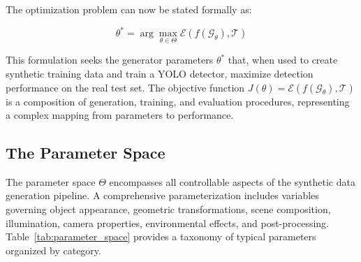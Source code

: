 The optimization problem can now be stated formally as:

\begin{equation}
\theta^* = \arg\max_{\theta \in \Theta} \mathcal{E}(f(\mathcal{G}_\theta), \mathcal{T})
\label{eq:optimization_objective}
\end{equation}

This formulation seeks the generator parameters $\theta^*$ that, when used to create synthetic training data and train a YOLO detector, maximize detection performance on the real test set. The objective function $J(\theta) = \mathcal{E}(f(\mathcal{G}_\theta), \mathcal{T})$ is a composition of generation, training, and evaluation procedures, representing a complex mapping from parameters to performance.

\subsection{The Parameter Space}
\label{subsec:parameter_space}

The parameter space $\Theta$ encompasses all controllable aspects of the synthetic data generation pipeline. A comprehensive parameterization includes variables governing object appearance, geometric transformations, scene composition, illumination, camera properties, environmental effects, and post-processing. Table~\ref{tab:parameter_space} provides a taxonomy of typical parameters organized by category.

